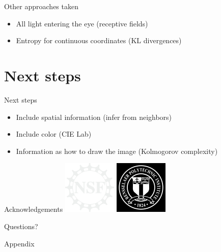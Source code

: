 \documentclass[14pt,c]{beamer}
\begin{document}
\begin{frame}{Other approaches taken}
  \begin{itemize}
    \item All light entering the eye (receptive fields)
    \item Entropy for continuous coordinates (KL divergences)
  \end{itemize}
\end{frame}

\section{Next steps}

\begin{frame}{Next steps}
  \begin{itemize}
    \item Include spatial information (infer from neighbors)
    \item Include color (CIE Lab)
    \item Information as how to draw the image (Kolmogorov complexity)
  \end{itemize}
\end{frame}

\begin{frame}{Acknowledgements}
  \centering
  \includegraphics[width=1in]{nsf}
  \quad
  \includegraphics[width=1in]{rpi}
\end{frame}

\appendix

\begin{frame}[c]
  \begin{center}
  \Large
  Questions?
  \end{center}
\end{frame}

\begin{frame}{Appendix}
  \centering
  \tableofcontents
\end{frame}
\end{document}

